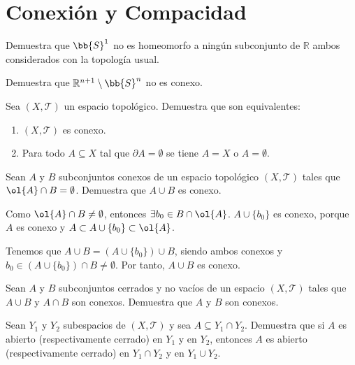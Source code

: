 \section{Conexión y Compacidad}\label{sec:Rel3}

\begin{ejercicio}
Demuestra que \( \bb{S}^1 \) no es homeomorfo a ningún subconjunto de \( \mathbb{R} \) ambos considerados con la topología usual.
\end{ejercicio}

\begin{ejercicio}
Demuestra que \( \mathbb{R}^{n+1} \setminus \bb{S}^n \) no es conexo.
\end{ejercicio}

\begin{ejercicio}
Sea \((X, \mathcal{T})\) un espacio topológico. Demuestra que son equivalentes:
\begin{enumerate}
\item \((X, \mathcal{T})\) es conexo.
\item Para todo \(A \subseteq X\) tal que \(\partial A = \emptyset\) se tiene \(A = X\) o \(A = \emptyset\).
\end{enumerate}
\end{ejercicio}

\begin{ejercicio}
Sean \(A\) y \(B\) subconjuntos conexos de un espacio topológico \((X, \mathcal{T})\) tales que \(\ol{A} \cap B = \emptyset\). Demuestra que \(A \cup B\) es conexo.


Como $\ol{A}\cap B\neq \emptyset$, entonces $\exists b_0\in B\cap \ol{A}$. $A\cup \{b_0\}$ es conexo, porque $A$ es conexo y $A\subset A\cup \{b_0\}\subset \ol{A}$.

Tenemos que $A\cup B = \left(A\cup \{b_0\}\right)\cup B$, siendo ambos conexos y $b_0\in \left(A\cup \{b_0\}\right)\cap B\neq \emptyset$. Por tanto, $A\cup B$ es conexo. 
\end{ejercicio}

\begin{ejercicio}
Sean \(A\) y \(B\) subconjuntos cerrados y no vacíos de un espacio \((X, \mathcal{T})\) tales que \(A \cup B\) y \(A \cap B\) son conexos. Demuestra que \(A\) y \(B\) son conexos.
\end{ejercicio}

\begin{ejercicio}
Sean \(Y_1\) y \(Y_2\) subespacios de \((X, \mathcal{T})\) y sea \(A \subseteq Y_1 \cap Y_2\). Demuestra que si \(A\) es abierto (respectivamente cerrado) en \(Y_1\) y en \(Y_2\), entonces \(A\) es abierto (respectivamente cerrado) en \(Y_1 \cap Y_2\) y en \(Y_1 \cup Y_2\).
\end{ejercicio}

